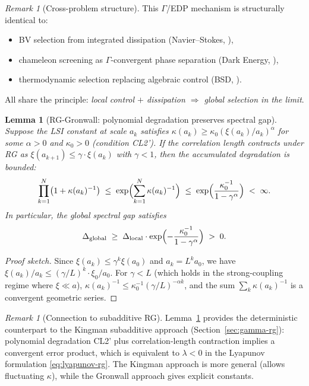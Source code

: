 \documentclass[12pt,a4paper]{article}
\theoremstyle{definition}
\theoremstyle{plain}
\newtheorem{lemma}[definition]{Lemma}
\theoremstyle{remark}
\newtheorem{remark}[definition]{Remark}
\begin{document}
\begin{remark}[Cross-problem structure]\label{rem:cross-edp-ym}
This $\Gamma$/EDP mechanism is structurally identical to:
\begin{itemize}
\item BV selection from integrated dissipation (Navier--Stokes, \cite{FST-NS2026}),
\item chameleon screening as $\Gamma$-convergent phase separation (Dark Energy, \cite{Geiger2026-DE}),
\item thermodynamic selection replacing algebraic control (BSD, \cite{Geiger2026-BSD}).
\end{itemize}
All share the principle: \emph{local control $+$ dissipation $\Rightarrow$ global selection in the limit}.
\end{remark}

\begin{lemma}[RG-Gronwall: polynomial degradation preserves spectral gap]\label{lem:rg-gronwall}
Suppose the LSI constant at scale $a_k$ satisfies $\kappa(a_k) \geq \kappa_0 (\xi(a_k)/a_k)^\alpha$ for some $\alpha > 0$ and $\kappa_0 > 0$ (condition CL2'). If the correlation length contracts under RG as $\xi(a_{k+1}) \leq \gamma \cdot \xi(a_k)$ with $\gamma < 1$, then the accumulated degradation is bounded:
\begin{equation}\label{eq:rg-gronwall}
  \prod_{k=1}^{N} \bigl(1 + \kappa(a_k)^{-1}\bigr) \;\leq\; \exp\Bigl(\sum_{k=1}^{N} \kappa(a_k)^{-1}\Bigr) \;\leq\; \exp\Bigl(\frac{\kappa_0^{-1}}{1 - \gamma^\alpha}\Bigr) \;<\; \infty.
\end{equation}
In particular, the global spectral gap satisfies
\[
  \Delta_{\mathrm{global}} \;\geq\; \Delta_{\mathrm{local}} \cdot \exp\Bigl(-\frac{\kappa_0^{-1}}{1 - \gamma^\alpha}\Bigr) \;>\; 0.
\]
\end{lemma}

\begin{proof}[Proof sketch]
Since $\xi(a_k) \leq \gamma^k \xi(a_0)$ and $a_k = L^k a_0$, we have $\xi(a_k)/a_k \leq (\gamma/L)^k \cdot \xi_0/a_0$. For $\gamma < L$ (which holds in the strong-coupling regime where $\xi \ll a$), $\kappa(a_k)^{-1} \leq \kappa_0^{-1} (\gamma/L)^{-\alpha k}$, and the sum $\sum_k \kappa(a_k)^{-1}$ is a convergent geometric series.
\end{proof}

\begin{remark}[Connection to subadditive RG]\label{rem:gronwall-kingman}
Lemma~\ref{lem:rg-gronwall} provides the deterministic counterpart to the Kingman subadditive approach (Section~\ref{sec:gamma-rg}): polynomial degradation CL2' plus correlation-length contraction implies a convergent error product, which is equivalent to $\lambda < 0$ in the Lyapunov formulation \eqref{eq:lyapunov-rg}. The Kingman approach is more general (allows fluctuating $\kappa$), while the Gronwall approach gives explicit constants.
\end{remark}
\end{document}
